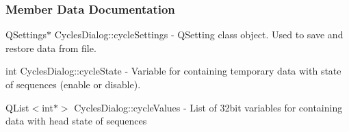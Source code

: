 \subsubsection{Member Data Documentation}
\begin{DoxyCompactItemize}
\item \mbox{\label{classCyclesDialog_aaf91e761bb72e2603988719a671aab3b}} 
{\footnotesize\ttfamily Q\+Settings$\ast$ Cycles\+Dialog\+::\texorpdfstring{cycle\+Settings}{cycleSettings}{\ttfamily [private]}}
 - Q\+Setting class object. Used to save and restore data from file.

\item \mbox{\label{classCyclesDialog_a0296f0dc0b57b44f6d69e1a9b5cc00ad}} 
{\footnotesize\ttfamily int Cycles\+Dialog\+::\texorpdfstring{cycle\+State}{cycleState}{\ttfamily [private]}}
 - Variable for containing temporary data with state of sequences (enable or disable). 

\item \mbox{\label{classCyclesDialog_a6c5035971ebd473201fa9c62e58fee3a}} 
{\footnotesize\ttfamily Q\+List$<$int$\ast$$>$ Cycles\+Dialog\+::\texorpdfstring{cycle\+Values}{cycleValues}{\ttfamily [private]}}
 - List of 32bit variables for containing data with head state of sequences


\end{DoxyCompactItemize}

